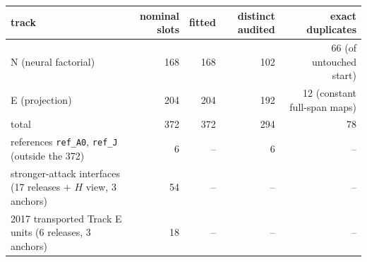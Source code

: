\begin{tabular}{@{}l r r r r@{}}
\toprule
track & nominal slots & fitted & distinct audited & exact duplicates \\
\midrule
N (neural factorial) & 168 & 168 & 102 & 66 (of untouched start) \\
E (projection) & 204 & 204 & 192 & 12 (constant full-span maps) \\
\midrule
total & 372 & 372 & 294 & 78 \\
\addlinespace
references \texttt{ref\_A0}, \texttt{ref\_J} (outside the 372) & 6 & -- & 6 & -- \\
stronger-attack interfaces (17 releases $+$ $H$ view, 3 anchors) & 54 & -- & -- & -- \\
2017 transported Track E units (6 releases, 3 anchors) & 18 & -- & -- & -- \\
\bottomrule
\end{tabular}
